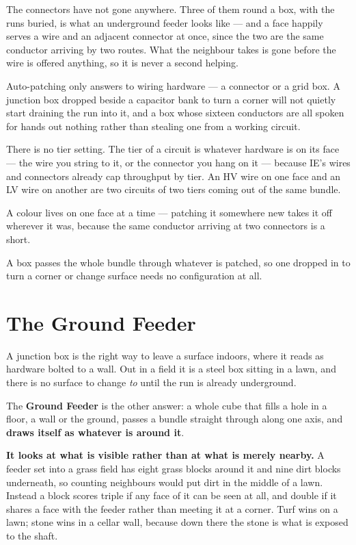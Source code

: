 \begin{ietip}
The connectors have not gone anywhere. Three of them round a box, with the runs buried, is what an
underground feeder looks like --- and a face happily serves a wire and an adjacent connector at
once, since the two are the same conductor arriving by two routes. What the neighbour takes is gone
before the wire is offered anything, so it is never a second helping.
\end{ietip}

\begin{ietip}
Auto-patching only answers to wiring hardware --- a connector or a grid box. A junction box dropped
beside a capacitor bank to turn a corner will not quietly start draining the run into it, and a box
whose sixteen conductors are all spoken for hands out nothing rather than stealing one from a
working circuit.
\end{ietip}

\begin{ietip}
There is no tier setting. The tier of a circuit is whatever hardware is on its face --- the wire you
string to it, or the connector you hang on it --- because IE's wires and connectors already cap
throughput by tier. An HV wire on one face and an LV wire on another are two circuits of two tiers
coming out of the same bundle.
\end{ietip}

A colour lives on one face at a time --- patching it somewhere new takes it off wherever it was,
because the same conductor arriving at two connectors is a short.

A box passes the whole bundle through whatever is patched, so one dropped in to turn a corner or
change surface needs no configuration at all.

\section{The Ground Feeder}

A junction box is the right way to leave a surface indoors, where it reads as hardware bolted to a
wall. Out in a field it is a steel box sitting in a lawn, and there is no surface to change
\emph{to} until the run is already underground.

The \textbf{Ground Feeder} is the other answer: a whole cube that fills a hole in a floor, a wall or
the ground, passes a bundle straight through along one axis, and \textbf{draws itself as whatever is
around it}.

\textbf{It looks at what is visible rather than at what is merely nearby.} A feeder set into a grass
field has eight grass blocks around it and nine dirt blocks underneath, so counting neighbours would
put dirt in the middle of a lawn. Instead a block scores triple if any face of it can be seen at all,
and double if it shares a face with the feeder rather than meeting it at a corner. Turf wins on a
lawn; stone wins in a cellar wall, because down there the stone is what is exposed to the shaft.

